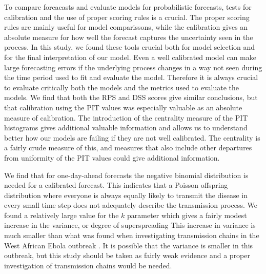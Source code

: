 \documentclass[12pt]{article}
\begin{document}
To compare foreacasts and evaluate models for probabilistic forecasts, tests for calibration and the use of proper scoring rules is a crucial. The proper scoring rules are mainly useful for model comparissons, while the calibration gives an absolute measure for how well the forecast captures the uncertainty seen in the process. In this study, we found these tools crucial both for model selection and for the final interpretation of our model. Even a well calibrated model can make large forecasting errors if the underlying process changes in a way not seen during the time period used to fit and evaluate the model. Therefore it is always crucial to evaluate critically both the models and the metrics used to evaluate the models. We find that both the RPS and DSS scores give similar conclusions, but that calibration using the PIT values was especially valuable as an absolute measure of calibration. The introduction of the centrality measure of the PIT histograms gives additional valuable information and allows us to understand better how our models are failing if they are not well calibrated. The centrality is a fairly crude measure of this, and measures that also include other departures from uniformity of the PIT values could give additional information. 

We find that for one-day-ahead forecasts the negative binomial distribution is needed for a calibrated forecast. This indicates that a Poisson offspring distribution where everyone is always equally likely to transmit the disease in every small time step does not adequately describe the transmission process. We found a relatively large value for the $k$ parameter which gives a fairly modest increase in the variance, or degree of superspreading This increase in variance is much smaller than what was found when investigating transmission chains in the West African Ebola outbreak \cite{internationalebolaresponseteamExposurePatternsDriving2016}. It is possible that the variance is smaller in this outbreak, but this study should be taken as fairly weak evidence and a proper investigation of transmission chains would be needed. 
\end{document}

